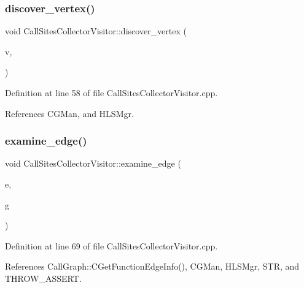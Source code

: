 \subsubsection{\texorpdfstring{discover\+\_\+vertex()}{discover\_vertex()}}
{\footnotesize\ttfamily void Call\+Sites\+Collector\+Visitor\+::discover\+\_\+vertex (\begin{DoxyParamCaption}\item[{const \hyperlink{graph_8hpp_abefdcf0544e601805af44eca032cca14}{vertex} \&}]{v,  }\item[{const \hyperlink{classCallGraph}{Call\+Graph} \&}]{ }\end{DoxyParamCaption})}



Definition at line 58 of file Call\+Sites\+Collector\+Visitor.\+cpp.



References C\+G\+Man, and H\+L\+S\+Mgr.

\mbox{\label{classCallSitesCollectorVisitor_aed0f4e539fe2c7d2af41e77ec74757d4}} 
\subsubsection{\texorpdfstring{examine\+\_\+edge()}{examine\_edge()}}
{\footnotesize\ttfamily void Call\+Sites\+Collector\+Visitor\+::examine\+\_\+edge (\begin{DoxyParamCaption}\item[{const \hyperlink{graph_8hpp_a9eb9afea34e09f484b21f2efd263dd48}{Edge\+Descriptor} \&}]{e,  }\item[{const \hyperlink{classCallGraph}{Call\+Graph} \&}]{g }\end{DoxyParamCaption})}



Definition at line 69 of file Call\+Sites\+Collector\+Visitor.\+cpp.



References Call\+Graph\+::\+C\+Get\+Function\+Edge\+Info(), C\+G\+Man, H\+L\+S\+Mgr, S\+TR, and T\+H\+R\+O\+W\+\_\+\+A\+S\+S\+E\+RT.


